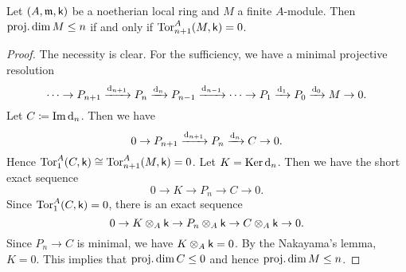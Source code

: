 

        \begin{lemma}\label{lem: tor control the projective dimension}
        Let \((A,{\mathfrak{m}},{\mathsf{k}})\) be a noetherian local ring and \(M\) a finite \(A\)-module.
        Then \(\operatorname{proj.dim} M \leq n\) if and only if \(\operatorname{Tor}_{n+1}^A(M,{\mathsf{k}}) = 0\).
    \end{lemma}
    \begin{proof}
        The necessity is clear.
        For the sufficiency, we have a minimal projective resolution
        \[ \cdots \to P_{n+1} \xrightarrow{{\mathrm{d}}_{n+1}} P_n \xrightarrow{{\mathrm{d}}_n} P_{n-1} \xrightarrow{{\mathrm{d}}_{n-1}} \cdots \to P_1 \xrightarrow{{\mathrm{d}}_1} P_0 \xrightarrow{{\mathrm{d}}_0} M \to 0. \]
        Let \(C \coloneqq \operatorname{Im} {\mathrm{d}}_n\).
        Then we have 
        \[ 0 \to P_{n+1} \xrightarrow{{\mathrm{d}}_{n+1}} P_n \xrightarrow{{\mathrm{d}}_n} C \to 0. \]
        Hence \(\operatorname{Tor}_{1}^A(C,{\mathsf{k}}) \cong \operatorname{Tor}_{n+1}^A(M,{\mathsf{k}}) = 0\).
        Let \(K = \operatorname{Ker} {\mathrm{d}}_n\).
        Then we have the short exact sequence
        \[ 0 \to K \to P_n \to C \to 0. \]
        Since \(\operatorname{Tor}_{1}^A(C,{\mathsf{k}}) = 0\), there is an exact sequence
        \[ 0 \to K \otimes_A {\mathsf{k}} \to P_n \otimes_A {\mathsf{k}} \to C \otimes_A {\mathsf{k}} \to 0. \]
        Since \(P_n \to C\) is minimal, we have \(K \otimes_A {\mathsf{k}} = 0\).
        By the Nakayama's lemma, \(K = 0\).
        This implies that \( \operatorname{proj.dim} C \leq 0\) and hence \(\operatorname{proj.dim} M \leq n\).
    \end{proof}

